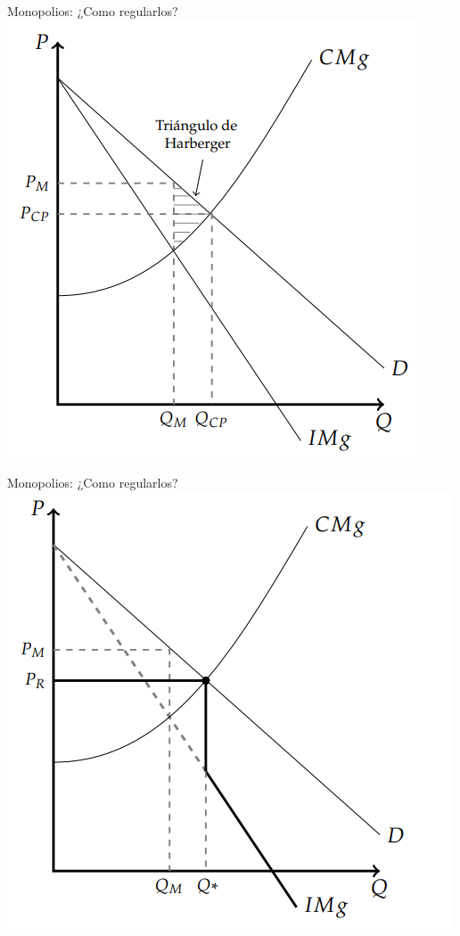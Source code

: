 \documentclass{beamer}
\begin{document}
\begin{frame}{Monopolios: ¿Como regularlos?}
    \centering
    \includegraphics[scale=0.7]{../Figures/C24.10.png}
\end{frame}

\begin{frame}{Monopolios: ¿Como regularlos?}
    \centering
    \includegraphics[scale=0.7]{../Figures/C24.11.png}
\end{frame}
\end{document}

